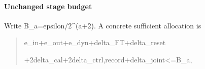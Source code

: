 \documentclass[
]{article}
\begin{document}
\paragraph{Unchanged stage budget}\label{unchanged-stage-budget}

Write
B\allowbreak{}\_\allowbreak{}a\allowbreak{}=\allowbreak{}e\allowbreak{}p\allowbreak{}s\allowbreak{}i\allowbreak{}l\allowbreak{}o\allowbreak{}n\allowbreak{}/\allowbreak{}2\allowbreak{}\^{}\allowbreak{}(\allowbreak{}a\allowbreak{}+\allowbreak{}2\allowbreak{})\allowbreak{}.
A concrete sufficient allocation is

\begin{quote}\small\ttfamily\raggedright\setlength{\parskip}{0pt}
\noindent e\allowbreak{}\_\allowbreak{}i\allowbreak{}n\allowbreak{}\hspace*{0.525em}\allowbreak{}+\allowbreak{}\hspace*{0.525em}\allowbreak{}e\allowbreak{}\_\allowbreak{}o\allowbreak{}u\allowbreak{}t\allowbreak{}\hspace*{0.525em}\allowbreak{}+\allowbreak{}\hspace*{0.525em}\allowbreak{}e\allowbreak{}\_\allowbreak{}d\allowbreak{}y\allowbreak{}n\allowbreak{}\hspace*{0.525em}\allowbreak{}+\allowbreak{}\hspace*{0.525em}\allowbreak{}d\allowbreak{}e\allowbreak{}l\allowbreak{}t\allowbreak{}a\allowbreak{}\_\allowbreak{}F\allowbreak{}T\allowbreak{}\hspace*{0.525em}\allowbreak{}+\allowbreak{}\hspace*{0.525em}\allowbreak{}d\allowbreak{}e\allowbreak{}l\allowbreak{}t\allowbreak{}a\allowbreak{}\_\allowbreak{}r\allowbreak{}e\allowbreak{}s\allowbreak{}e\allowbreak{}t\par
\noindent \hspace*{0.525em}\allowbreak{}\hspace*{0.525em}\allowbreak{}+\allowbreak{}\hspace*{0.525em}\allowbreak{}2\allowbreak{}\hspace*{0.525em}\allowbreak{}d\allowbreak{}e\allowbreak{}l\allowbreak{}t\allowbreak{}a\allowbreak{}\_\allowbreak{}c\allowbreak{}a\allowbreak{}l\allowbreak{}\hspace*{0.525em}\allowbreak{}+\allowbreak{}\hspace*{0.525em}\allowbreak{}2\allowbreak{}\hspace*{0.525em}\allowbreak{}d\allowbreak{}e\allowbreak{}l\allowbreak{}t\allowbreak{}a\allowbreak{}\_\allowbreak{}c\allowbreak{}t\allowbreak{}r\allowbreak{}l\allowbreak{},\allowbreak{}r\allowbreak{}e\allowbreak{}c\allowbreak{}o\allowbreak{}r\allowbreak{}d\allowbreak{}\hspace*{0.525em}\allowbreak{}+\allowbreak{}\hspace*{0.525em}\allowbreak{}d\allowbreak{}e\allowbreak{}l\allowbreak{}t\allowbreak{}a\allowbreak{}\_\allowbreak{}j\allowbreak{}o\allowbreak{}i\allowbreak{}n\allowbreak{}t\allowbreak{}\hspace*{0.525em}\allowbreak{}<\allowbreak{}=\allowbreak{}\hspace*{0.525em}\allowbreak{}B\allowbreak{}\_\allowbreak{}a\allowbreak{},\par

\end{quote}
\end{document}
